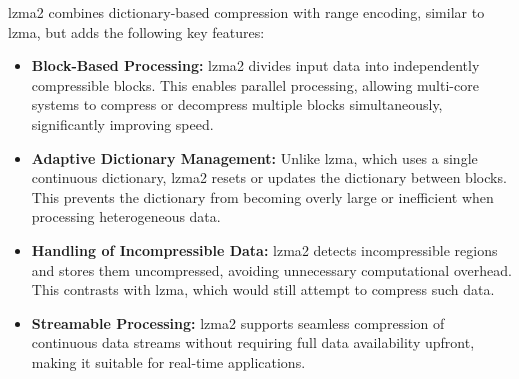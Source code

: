     \gls{lzma}2 combines dictionary-based compression with range encoding, similar to \gls{lzma}, but adds the following key features:
    \begin{itemize}
        \item \textbf{Block-Based Processing:} \gls{lzma}2 divides input data into independently compressible blocks. This enables parallel processing, allowing multi-core systems to compress or decompress multiple blocks simultaneously, significantly improving speed.
        \item \textbf{Adaptive Dictionary Management:} Unlike \gls{lzma}, which uses a single continuous dictionary, \gls{lzma}2 resets or updates the dictionary between blocks. This prevents the dictionary from becoming overly large or inefficient when processing heterogeneous data.
        \item \textbf{Handling of Incompressible Data:} \gls{lzma}2 detects incompressible regions and stores them uncompressed, avoiding unnecessary computational overhead. This contrasts with \gls{lzma}, which would still attempt to compress such data.
        \item \textbf{Streamable Processing:} \gls{lzma}2 supports seamless compression of continuous data streams without requiring full data availability upfront, making it suitable for real-time applications.
    \end{itemize}
    
